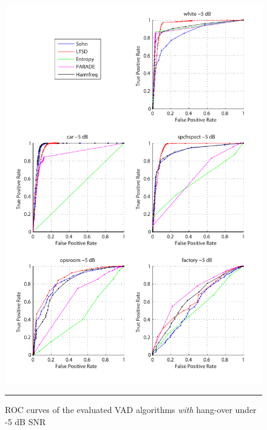 \begin{figure}[htbp]
	\centering
		\includegraphics[width=1.0\columnwidth]{Figures/Chapter3/-5dBh.pdf}
		\rule{37em}{0.5pt}
	\caption[ROC curves of the evaluated algorithms \emph{with} hang-over under -5 dB SNR]{ROC curves of the evaluated VAD algorithms \emph{with} hang-over under -5 dB SNR}
	\label{fig:-5dBh}
\end{figure}

